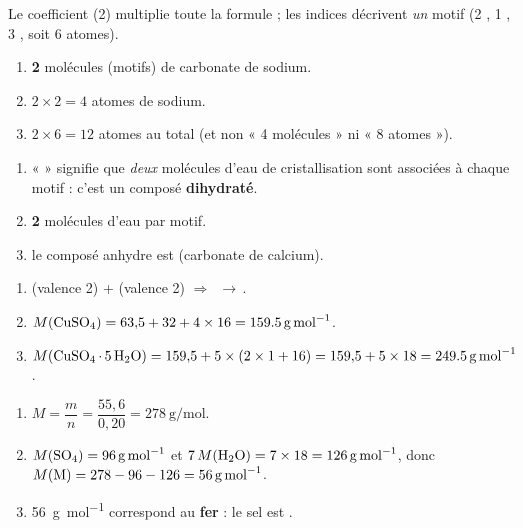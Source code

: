\documentclass[11pt,a4paper]{article}
\begin{document}
\begin{corrige}
Le coefficient (2) multiplie toute la formule ; les indices décrivent \emph{un} motif 
(2 , 1 , 3 , soit 6 atomes).
\begin{enumerate}[label=\alph*)]
  \item \textbf{2} molécules (motifs) de carbonate de sodium.
  \item $2 \times 2 = \boxed{4}$ atomes de sodium.
  \item $2 \times 6 = \boxed{12}$ atomes au total (et non « 4 molécules » ni « 8 atomes »).
\end{enumerate}
\end{corrige}

\begin{corrige}
\begin{enumerate}[label=\alph*)]
  \item «  » signifie que \emph{deux} molécules d'eau de cristallisation sont associées à chaque
        motif  : c'est un composé \textbf{dihydraté}.
  \item \textbf{2} molécules d'eau par motif.
  \item le composé anhydre est  (carbonate de calcium).
\end{enumerate}
\end{corrige}

\begin{corrige}
\begin{enumerate}[label=\alph*)]
  \item {} (valence 2) +  (valence 2) $\Rightarrow$ \,$\to$\,.
  \item $M(\ce{CuSO4}) = 63{,}5 + 32 + 4\times16 = \qty{159,5}{\gram\per\mol}$.
  \item $M(\ce{CuSO4 . 5 H2O}) = 159{,}5 + 5\times(2\times1+16) = 159{,}5 + 5\times18 = \qty{249,5}{\gram\per\mol}$.
\end{enumerate}
\end{corrige}

\begin{corrige}
\begin{enumerate}[label=\alph*)]
  \item $M = \dfrac{m}{n} = \dfrac{55{,}6}{0{,}20} = \qty{278}{\gram\per\mol}$.
  \item $M(\ce{SO4})=\qty{96}{\gram\per\mol}$ et $7\,M(\ce{H2O})=7\times18=\qty{126}{\gram\per\mol}$, donc
        $M(\ce{M}) = 278 - 96 - 126 = \qty{56}{\gram\per\mol}$.
  \item \qty{56}{\gram\per\mol} correspond au \textbf{fer}  : le sel est .
\end{enumerate}
\end{corrige}
\end{document}
